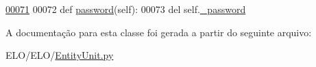 \begin{DoxyCode}
\hypertarget{classELO_1_1EntityUnit_1_1User_l00071}{}\hyperlink{classELO_1_1EntityUnit_1_1User_a01ae16d257db991dd048c84dba5034c0}{00071} 
00072     \textcolor{keyword}{def }\hyperlink{classELO_1_1EntityUnit_1_1User_a01ae16d257db991dd048c84dba5034c0}{password}(self):
00073         del self.\hyperlink{classELO_1_1EntityUnit_1_1User_a084a787c085aa13221a2c3b08132a0b5}{\_password}

\end{DoxyCode}


A documentação para esta classe foi gerada a partir do seguinte arquivo\-:\begin{DoxyCompactItemize}
\item 
E\-L\-O/\-E\-L\-O/\hyperlink{EntityUnit_8py}{Entity\-Unit.\-py}\end{DoxyCompactItemize}

